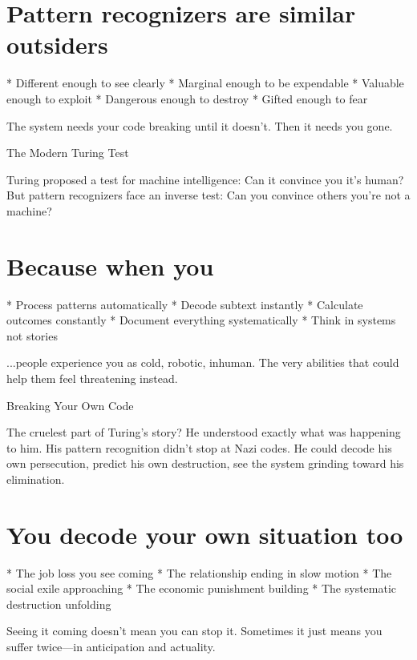 \documentclass[12pt,oneside]{book}
\begin{document}
\section{Pattern recognizers are similar outsiders}

                    * Different enough to see clearly
                    * Marginal enough to be expendable
                    * Valuable enough to exploit
                    * Dangerous enough to destroy
                    * Gifted enough to fear

The system needs your code breaking until it doesn't. Then it needs you gone.

The Modern Turing Test

Turing proposed a test for machine intelligence: Can it convince you it's human? But pattern recognizers face an inverse test: Can you convince others you're not a machine?

\section{Because when you}

                    * Process patterns automatically
                    * Decode subtext instantly
                    * Calculate outcomes constantly
                    * Document everything systematically
                    * Think in systems not stories

...people experience you as cold, robotic, inhuman. The very abilities that could help them feel threatening instead.

Breaking Your Own Code

The cruelest part of Turing's story? He understood exactly what was happening to him. His pattern recognition didn't stop at Nazi codes. He could decode his own persecution, predict his own destruction, see the system grinding toward his elimination.

\section{You decode your own situation too}

                    * The job loss you see coming
                    * The relationship ending in slow motion
                    * The social exile approaching
                    * The economic punishment building
                    * The systematic destruction unfolding

Seeing it coming doesn't mean you can stop it. Sometimes it just means you suffer twice---in anticipation and actuality.
\end{document}

